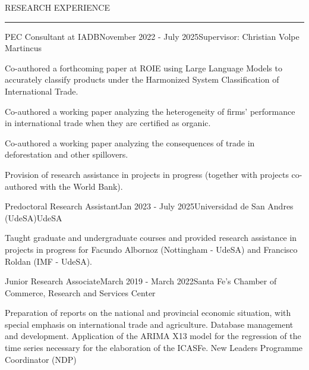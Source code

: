 \documentclass{resume} %
\renewenvironment{rSection}[1]{
\sectionskip
\textcolor{CustomRed}{\MakeUppercase{#1}}
\sectionlineskip
\hrule
\begin{list}{}{
\setlength{\leftmargin}{1.5em}
}
\item[]
}{
\end{list}
}
\begin{document}
\vspace{-0.3cm}
\begin{rSection}{Research Experience}
\begin{rSubsection}{PEC Consultant at IADB}{November 2022 - July 2025}{Supervisor: Christian Volpe Martincus}{}

\item Co-authored a forthcoming paper at ROIE using Large Language Models to accurately classify products under the Harmonized System Classification of International Trade.
\item Co-authored a working paper analyzing the heterogeneity of firms' performance in international trade when they are certified as organic.
\item Co-authored a working paper analyzing the consequences of trade in deforestation and other spillovers.
\item Provision of research assistance in projects in progress (together with projects co-authored with the World Bank).
\end{rSubsection}

\begin{rSubsection}{Predoctoral Research Assistant}{Jan 2023 - July 2025}{Universidad de San Andres (UdeSA)}{UdeSA}
\item Taught graduate and undergraduate courses and provided research assistance in projects in progress for Facundo Albornoz (Nottingham - UdeSA) and Francisco Roldan (IMF - UdeSA).
\end{rSubsection}

\begin{rSubsection}{Junior Research Associate}{March 2019 - March 2022}{Santa Fe's Chamber of Commerce, Research and Services Center}{}
\item Preparation of reports on the national and provincial economic situation, with special emphasis on international trade and agriculture. Database management and development. Application of the ARIMA X13 model for the regression of the time series necessary for the elaboration of the ICASFe. New Leaders Programme Coordinator (NDP)
\end{rSubsection}
\end{rSection}
\end{document}
